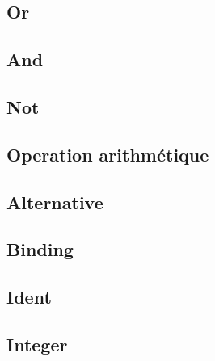 \documentclass[a4paper,12pt]{report}
\begin{document}
\subsection{Or}
\subsection{And}
\subsection{Not}
\subsection{Operation arithmétique}
\subsection{Alternative}
\subsection{Binding}
\subsection{Ident}
\subsection{Integer}
\end{document}
